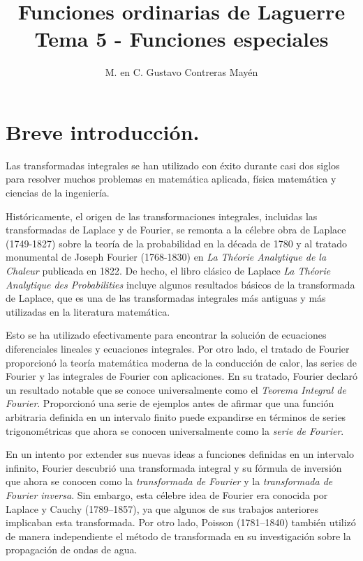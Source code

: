 
\usepackage{apacite}
\title{Funciones ordinarias de Laguerre \\ \large {Tema 5 - Funciones especiales} \vspace{-3ex}}
\author{M. en C. Gustavo Contreras Mayén}
\date{ }

\vspace{-4cm}
\maketitle
\fontsize{14}{14}\selectfont
\tableofcontents
\newpage
\section{Breve introducción.}
Las transformadas integrales se han utilizado con éxito durante casi dos siglos para resolver muchos problemas en matemática aplicada, física matemática y ciencias de la ingeniería.
\par
Históricamente, el origen de las transformaciones integrales, incluidas las transformadas de Laplace y de Fourier, se remonta a la célebre obra de Laplace (1749-1827) sobre la teoría de la probabilidad en la década de 1780 y al tratado monumental de Joseph Fourier (1768-1830) en \emph{La Théorie Analytique de la Chaleur} publicada en 1822. De hecho, el libro clásico de Laplace \emph{La Théorie Analytique des Probabilities} incluye algunos resultados básicos de la transformada de Laplace, que es una de las transformadas integrales más antiguas y más utilizadas en la literatura matemática. 
\par
Esto se ha utilizado efectivamente para encontrar la solución de ecuaciones diferenciales lineales y ecuaciones integrales. Por otro lado, el tratado de Fourier proporcionó la teoría matemática moderna de la conducción de calor, las series de Fourier y las integrales de Fourier con aplicaciones. En su tratado, Fourier declaró un resultado notable que se conoce universalmente como el \emph{Teorema Integral de Fourier}. Proporcionó una serie de ejemplos antes de afirmar que una función arbitraria definida en un intervalo finito puede expandirse en términos de series trigonométricas que ahora se conocen universalmente como la \emph{serie de Fourier}.
\par
En un intento por extender sus nuevas ideas a funciones definidas en un intervalo infinito, Fourier descubrió una transformada integral y su fórmula de inversión que ahora se conocen como la \emph{transformada de Fourier} y la \emph{transformada de Fourier inversa}. Sin embargo, esta célebre idea de Fourier era conocida por Laplace y Cauchy (1789–1857), ya que algunos de sus trabajos anteriores implicaban esta transformada. Por otro lado, Poisson (1781–1840) también utilizó de manera independiente el método de transformada en su investigación sobre la propagación de ondas de agua.
